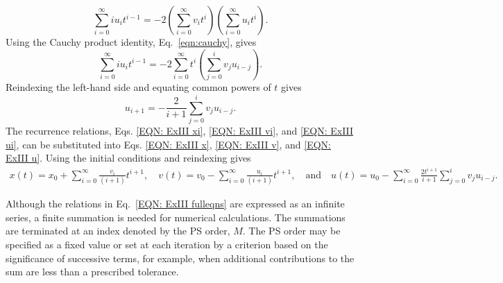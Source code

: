 \documentclass{article}
\begin{document}
    \begin{equation*}
         \sum_{i=0}^\infty iu_it^{i-1}=-2\left( \sum_{i=0}^\infty v_it^i \right)\left( \sum_{i=0}^\infty u_it^i\right).
    \end{equation*}
Using the Cauchy product identity, Eq.~\eqref{eqn:cauchy}, gives
   \begin{equation*}
         \sum_{i=0}^\infty iu_it^{i-1}=-2\sum_{i=0}^\infty t^i\left(\sum_{j=0}^i v_ju_{i-j}\right).
    \end{equation*}
Reindexing the left-hand side and equating common powers of $t$ gives
    \begin{equation}\label{EQN: ExIII ui}
         u_{i+1}=-\frac{2}{i+1}\sum_{j=0}^iv_ju_{i-j}.
    \end{equation}
The recurrence relations, Eqs. \eqref{EQN: ExIII xi}, \eqref{EQN: ExIII vi}, and \eqref{EQN: ExIII ui}, can be substituted into Eqs. \eqref{EQN: ExIII x}, \eqref{EQN: ExIII v}, and \eqref{EQN: ExIII u}. Using the initial conditions and reindexing gives
    \begin{gather} \label{EQN: ExIII fulleqns}
        x(t)= x_0 + \sum_{i=0}^\infty\frac{v_i}{(i+1)} t^{i+1},\quad
        v(t)= v_0 - \sum_{i=0}^\infty \frac{u_i}{(i+1)}t^{i+1}, \quad\mbox{and}\quad        
        u(t)=u_0 - \sum_{i=0}^\infty \frac{2t^{i+1}}{i+1}\sum_{j=0}^iv_ju_{i-j}.
    \end{gather}

Although the relations in Eq.~\eqref{EQN: ExIII fulleqns} are expressed as an infinite series, a finite summation is needed for numerical calculations. The summations are terminated at an index denoted by the PS order, $M$. The PS order may be specified as a fixed value or set at each iteration by a criterion based on the significance of successive terms, for example, when additional contributions to the sum are less than a prescribed tolerance.
\end{document}

